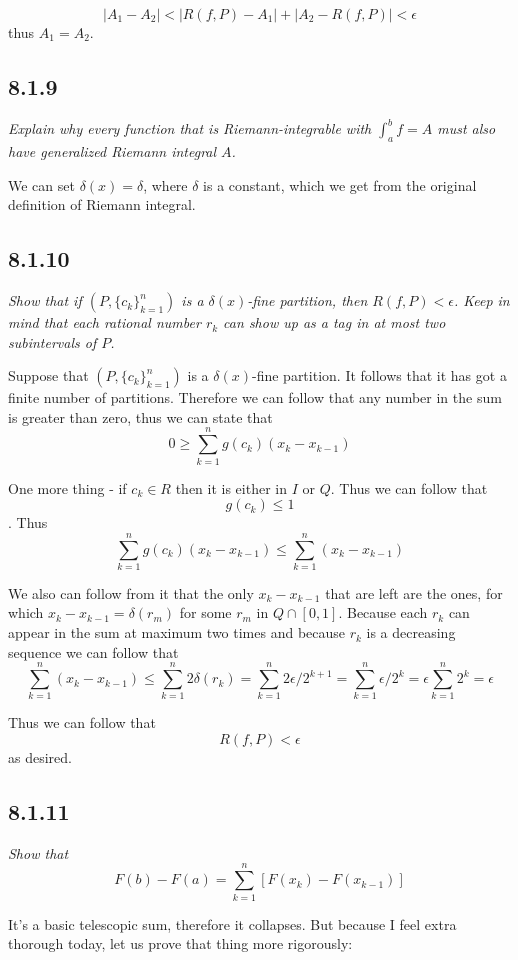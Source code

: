 \documentclass[11pt,oneside,titlepage]{book}
\begin{document}
$$|A_1 - A_2| < |R(f, P) - A_1| + |A_2 - R(f, P)| < \epsilon$$
thus $A_1 = A_2$.

\subsection*{8.1.9}
\textit{Explain why every function that is Riemann-integrable with
  $\int_a^b f = A$ must also have generalized Riemann integral $A$.}

We can set $\delta(x) = \delta$, where $\delta$ is a constant, which
we get from the original definition of Riemann integral.

\subsection*{8.1.10}
\textit{Show that if $(P, \{c_k\}_{k = 1}^n)$ is a $\delta(x)$-fine partition, then
  $R(f, P) < \epsilon$. Keep in mind that each rational number $r_k$ can show up as a tag
  in at most two subintervals of $P$.}

Suppose that $(P, \{c_k\}_{k = 1}^n)$ is a $\delta(x)$-fine partition. It follows that
it has got a finite number of partitions. Therefore we can follow that
any number in the sum is greater than zero, thus we can state that
$$0 \geq \sum_{k = 1}^n g(c_k)(x_k - x_{k - 1}) $$

One more thing - if $c_k \in R$ then it is either in $I$ or $Q$. Thus we can follow that
$$g(c_k) \leq 1$$. Thus
$$ \sum_{k = 1}^n g(c_k)(x_k - x_{k - 1}) \leq  \sum_{k = 1}^n (x_k - x_{k - 1}) $$

We also can follow from it that the only $x_k - x_{k - 1}$ that are left are the ones,
for which $x_k - x_{k - 1} =\delta(r_m)$ for some $r_m$ in $Q \cap [0, 1]$. 
Because each $r_k$ can appear in the sum at maximum two times and because
$r_k$ is a decreasing sequence we can follow that
$$\sum_{k = 1}^n (x_k - x_{k - 1}) \leq \sum_{k = 1}^n{2\delta(r_k)} =
\sum_{k = 1}^n{2 \epsilon/2^{k + 1}} = \sum_{k = 1}^n{\epsilon/2^{k}} =
\epsilon \sum_{k = 1}^n{2^{k}} =  \epsilon$$

Thus we can follow that
$$R(f, P) < \epsilon$$
as desired.

\subsection*{8.1.11}
\textit{Show that }
$$F(b) - F(a) = \sum_{k = 1}^n{[F(x_k) - F(x_{k - 1})]}$$

It's a basic telescopic sum, therefore it collapses. But because I feel extra thorough today,
let us prove that thing more rigorously:
\end{document}

